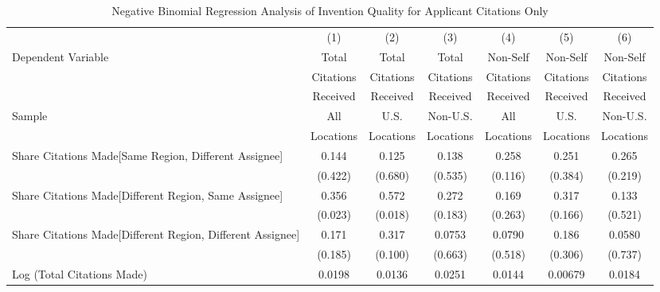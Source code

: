 \begin{table}[htbp]\centering \caption{Negative Binomial Regression Analysis of Invention Quality for Applicant Citations Only \label{a.model123192021}} 
\begin{adjustbox}{angle=90}
\begin{tabular}{l*{6}{c}} \hline\hline
                &\multicolumn{1}{c}{(1)}&\multicolumn{1}{c}{(2)}&\multicolumn{1}{c}{(3)}&\multicolumn{1}{c}{(4)}&\multicolumn{1}{c}{(5)}&\multicolumn{1}{c}{(6)}\\
 \multirow{3}{*}{Dependent Variable} &\multicolumn{1}{c}{Total}&\multicolumn{1}{c}{Total}&\multicolumn{1}{c}{Total}&\multicolumn{1}{c}{Non-Self}&\multicolumn{1}{c}{Non-Self}&\multicolumn{1}{c}{Non-Self}\\
                &\multicolumn{1}{c}{Citations}&\multicolumn{1}{c}{Citations}&\multicolumn{1}{c}{Citations}&\multicolumn{1}{c}{Citations}&\multicolumn{1}{c}{Citations}&\multicolumn{1}{c}{Citations}\\
                 &\multicolumn{1}{c}{Received}&\multicolumn{1}{c}{Received}&\multicolumn{1}{c}{Received}&\multicolumn{1}{c}{Received}&\multicolumn{1}{c}{Received}&\multicolumn{1}{c}{Received}\\
                 \hline
 \multirow{2}{*}{Sample}&\multicolumn{1}{c}{All}&\multicolumn{1}{c}{U.S.}&\multicolumn{1}{c}{Non-U.S.}&\multicolumn{1}{c}{All}&\multicolumn{1}{c}{U.S.}&\multicolumn{1}{c}{Non-U.S.}\\       
  &\multicolumn{1}{c}{Locations}&\multicolumn{1}{c}{Locations}&\multicolumn{1}{c}{Locations}&\multicolumn{1}{c}{Locations}&\multicolumn{1}{c}{Locations}&\multicolumn{1}{c}{Locations}\\         
\hline
Share Citations Made[Same Region, Different Assignee]&    0.144&    0.125&    0.138&    0.258&    0.251&    0.265\\
                &  (0.422)&  (0.680)&  (0.535)&  (0.116)&  (0.384)&  (0.219)\\
Share Citations Made[Different Region, Same Assignee]&    0.356&    0.572&    0.272&    0.169&    0.317&    0.133\\
                &  (0.023)&  (0.018)&  (0.183)&  (0.263)&  (0.166)&  (0.521)\\
Share Citations Made[Different Region, Different Assignee]&    0.171&    0.317&   0.0753&   0.0790&    0.186&   0.0580\\
                &  (0.185)&  (0.100)&  (0.663)&  (0.518)&  (0.306)&  (0.737)\\
Log (Total Citations Made)&   0.0198&   0.0136&   0.0251&   0.0144&  0.00679&   0.0184\\

\end{tabular}
\end{adjustbox}
\end{table}
